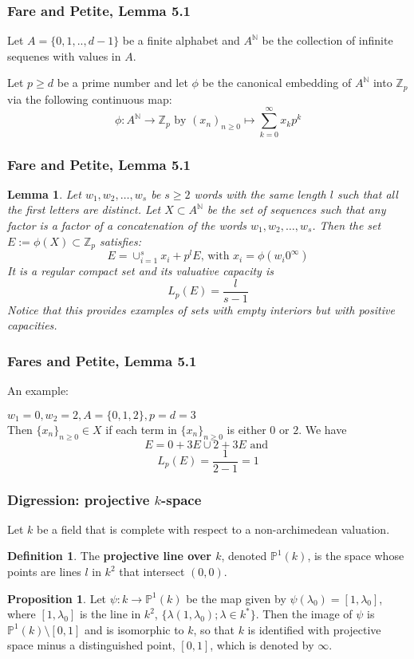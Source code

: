 \documentclass{beamer}
\theoremstyle{definition}
\newtheorem*{proposition*}{Proposition}
\newtheorem*{lemma*}{Lemma}
\newtheorem*{definition*}{Definition}
\begin{document}
\begin{frame}
\frametitle{Fare and Petite, Lemma 5.1}
Let $A=\{0,1,..,d-1\}$ be a finite alphabet and $A^{\mathbb{N}}$ be the collection of infinite sequenes with values in $A$. 
\parskip=20pt

Let $p \geq d$ be a prime number and let $\phi$ be the canonical embedding of $A^\mathbb{N}$ into $\mathbb{Z}_p$ via the following continuous  map: \[ \phi: A^{\mathbb{N}} \rightarrow \mathbb{Z}_p \text{ by } (x_n)_{n\geq0} \mapsto \sum_{k=0}^\infty x_kp^k\]
\end{frame}

\begin{frame}
\frametitle{Fare and Petite, Lemma 5.1}
\begin{lemma*} \textit{Let $w_1,w_2,\ldots,w_s$ be $s\geq 2$ words with the same length $l$ such that all the first letters are distinct. Let $X \subset A^{\mathbb{N}}$ be the set of sequences such that any factor is a factor of a concatenation of the words $w_1,w_2,\ldots,w_s$. Then the set $E := \phi(X) \subset \mathbb{Z}_p$ satisfies: \[E=\cup_{i=1}^s x_i +p^l E \text{,   with } x_i=\phi(w_i0^\infty)\]
It is a regular compact set and its valuative capacity is \[L_p(E) = \frac{l}{s-1}\] Notice that this provides examples of sets with empty interiors but with positive capacities.}
\end{lemma*}
\end{frame}

\begin{frame}
\frametitle{Fares and Petite, Lemma 5.1}
An example:\parskip=20pt


	$w_1=0, w_2=2,  A=\{0,1,2\}, p=d=3$\\
	Then $\{x_n\}_{n\geq0} \in X$ if each term in  $\{x_n\}_{n\geq0}$ is either $0$ or $2$. We have \[E=0 + 3E \cup 2 + 3E \text{ and }\]  \[L_p(E) = \frac{1}{2-1} =1\] 

\end{frame}

\begin{frame}
\frametitle{Digression: projective $k$-space}
 Let $k$ be a field that is complete with respect to a non-archimedean valuation.

\begin{definition*} The \textbf{projective line over $k$}, denoted $\mathbb{P}^1(k)$, is the space whose points are lines $l$ in $k^2$ that intersect $(0,0)$.%
\end{definition*}


\begin{proposition*} Let $\psi: k \rightarrow \mathbb{P}^1(k)$ be the map given by $\psi(\lambda_0) = [1, \lambda_0]$, where $ [1, \lambda_0]$ is the line in $k^2$, $\{\lambda(1, \lambda_0); \lambda \in k^*\}$. Then the image of $\psi$ is $\mathbb{P}^1(k) \setminus [0,1]$ and is isomorphic to $k$, so that $k$ is identified with projective space minus a distinguished point, $[0,1]$, which is denoted by $\infty$.  
\end{proposition*}
\end{frame}
\end{document}
